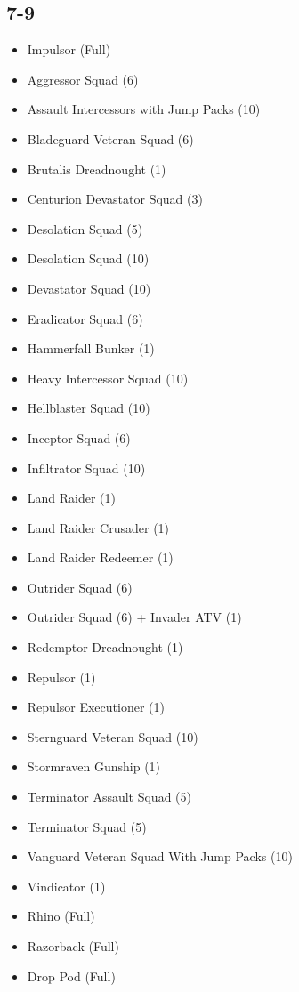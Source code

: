 \documentclass{HordeModeTarot}
\begin{document}
\begin{multicols}{2}
\subsection*{7-9}
\begin{itemize}[leftmargin=*]
\item[] Impulsor (Full)
\item[] Aggressor Squad (6)
\item[] Assault Intercessors with Jump Packs (10)
\item[] Bladeguard Veteran Squad (6)
\item[] Brutalis Dreadnought (1)
\item[] Centurion Devastator Squad (3)
\item[] Desolation Squad (5)
\item[] Desolation Squad (10)
\item[] Devastator Squad (10)
\item[] Eradicator Squad (6)
\item[] Hammerfall Bunker (1)
\item[] Heavy Intercessor Squad (10)
\item[] Hellblaster Squad (10)
\item[] Inceptor Squad (6)
\item[] Infiltrator Squad (10)
\item[] Land Raider (1)
\item[] Land Raider Crusader (1)
\item[] Land Raider Redeemer (1)
\item[] Outrider Squad (6)
\item[] Outrider Squad (6) + Invader ATV (1)
\item[] Redemptor Dreadnought (1)
\item[] Repulsor (1)
\item[] Repulsor Executioner (1)
\item[] Sternguard Veteran Squad (10)
\item[] Stormraven Gunship (1)
\item[] Terminator Assault Squad (5)
\item[] Terminator Squad (5)
\item[] Vanguard Veteran Squad With Jump Packs (10)
\item[] Vindicator (1)
\item[] Rhino (Full)
\item[] Razorback (Full)
\item[] Drop Pod (Full)
\end{itemize}


\end{multicols}
\end{document}
